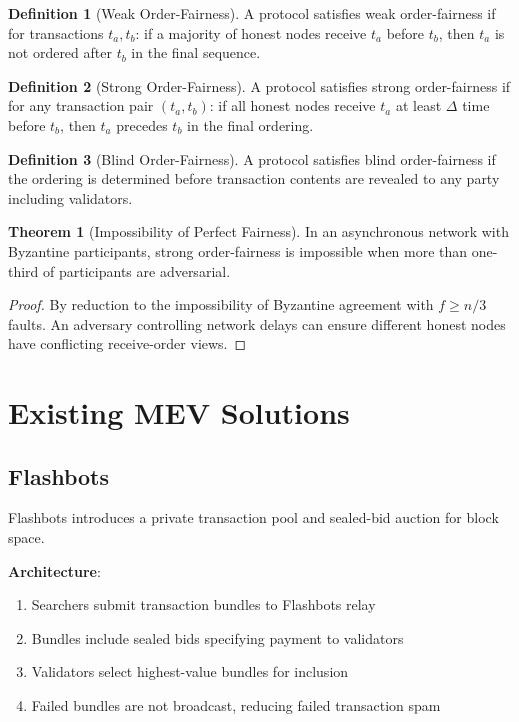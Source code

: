 \documentclass[11pt,a4paper]{article}
\theoremstyle{definition}
\newtheorem{definition}{Definition}
\newtheorem{theorem}{Theorem}
\begin{document}
\begin{definition}[Weak Order-Fairness]
A protocol satisfies weak order-fairness if for transactions $t_a, t_b$: if a majority of honest nodes receive $t_a$ before $t_b$, then $t_a$ is not ordered after $t_b$ in the final sequence.
\end{definition}

\begin{definition}[Strong Order-Fairness]
A protocol satisfies strong order-fairness if for any transaction pair $(t_a, t_b)$: if all honest nodes receive $t_a$ at least $\Delta$ time before $t_b$, then $t_a$ precedes $t_b$ in the final ordering.
\end{definition}

\begin{definition}[Blind Order-Fairness]
A protocol satisfies blind order-fairness if the ordering is determined before transaction contents are revealed to any party including validators.
\end{definition}

\begin{theorem}[Impossibility of Perfect Fairness]
In an asynchronous network with Byzantine participants, strong order-fairness is impossible when more than one-third of participants are adversarial.
\end{theorem}

\begin{proof}
By reduction to the impossibility of Byzantine agreement with $f \geq n/3$ faults. An adversary controlling network delays can ensure different honest nodes have conflicting receive-order views.
\end{proof}

\section{Existing MEV Solutions}

\subsection{Flashbots}

Flashbots introduces a private transaction pool and sealed-bid auction for block space.

\textbf{Architecture}:
\begin{enumerate}
    \item Searchers submit transaction bundles to Flashbots relay
    \item Bundles include sealed bids specifying payment to validators
    \item Validators select highest-value bundles for inclusion
    \item Failed bundles are not broadcast, reducing failed transaction spam
\end{enumerate}
\end{document}
